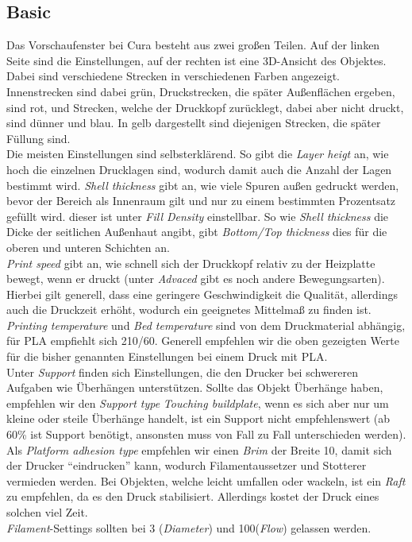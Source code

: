 \documentclass[11pt,a4paper]{scrartcl}
\begin{document}
\subsection*{Basic}
Das Vorschaufenster bei Cura besteht aus zwei großen Teilen. Auf der linken Seite sind die Einstellungen, auf der rechten ist eine 3D-Ansicht des Objektes. Dabei sind verschiedene Strecken in verschiedenen Farben angezeigt. Innenstrecken sind dabei grün, Druckstrecken, die später Außenflächen ergeben, sind rot, und Strecken, welche der Druckkopf zurücklegt, dabei aber nicht druckt, sind dünner und blau. In gelb dargestellt sind diejenigen Strecken, die später Füllung sind.\\
Die meisten Einstellungen sind selbsterklärend. So gibt die \textit{Layer heigt} an, wie hoch die einzelnen Drucklagen sind, wodurch damit auch die Anzahl der Lagen bestimmt wird. \textit{Shell thickness} gibt an, wie viele Spuren außen gedruckt werden, bevor der Bereich als Innenraum gilt und nur zu einem bestimmten Prozentsatz gefüllt wird. dieser ist unter \textit{Fill Density} einstellbar. So wie \textit{Shell thickness} die Dicke der seitlichen Außenhaut angibt, gibt \textit{Bottom/Top thickness} dies für die oberen und unteren Schichten an.\\
\textit{Print speed} gibt an, wie schnell sich der Druckkopf relativ zu der Heizplatte bewegt, wenn er druckt (unter \textit{Advaced} gibt es noch andere Bewegungsarten). Hierbei gilt generell, dass eine geringere Geschwindigkeit die Qualität, allerdings auch die Druckzeit erhöht, wodurch ein geeignetes Mittelmaß zu finden ist. \textit{Printing temperature} und \textit{Bed temperature} sind von dem Druckmaterial abhängig, für PLA empfiehlt sich 210/60. Generell empfehlen wir die oben gezeigten Werte für die bisher genannten Einstellungen bei einem Druck mit PLA.\\
Unter \textit{Support} finden sich Einstellungen, die den Drucker bei schwereren Aufgaben wie Überhängen unterstützen. Sollte das Objekt Überhänge haben, empfehlen wir den \textit{Support type} \textit{Touching buildplate}, wenn es sich aber nur um kleine oder steile Überhänge handelt, ist ein Support nicht empfehlenswert (ab 60\% ist Support benötigt, ansonsten muss von Fall zu Fall unterschieden werden). Als \textit{Platform adhesion type} empfehlen wir einen \textit{Brim} der Breite 10, damit sich der Drucker \enquote{eindrucken} kann, wodurch Filamentaussetzer und Stotterer vermieden werden. Bei Objekten, welche leicht umfallen oder wackeln, ist ein \textit{Raft} zu empfehlen, da es den Druck stabilisiert. Allerdings kostet der Druck eines solchen viel Zeit.\\
\textit{Filament}-Settings sollten bei 3 (\textit{Diameter}) und 100(\textit{Flow}) gelassen werden.\\
\\
\end{document}

